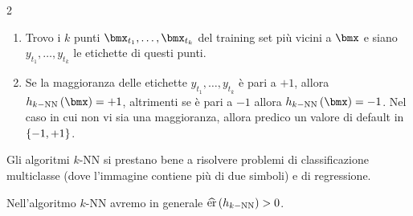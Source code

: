 \documentclass[\main/main.tex]{subfiles}
\begin{document}
\begin{multicols}{2}
\begin{definition}[Algoritmi \(k\)-NN]
        \begin{enumerate}
            \item Trovo i \(k\) punti \(\bmx_{t_1}, \ldots, \bmx_{t_k}\) del training set più vicini a \(\bmx\) e siano \(y_{t_1}, \ldots, y_{t_k}\) le etichette di questi punti.
            \item Se la maggioranza delle etichette \(y_{t_1}, \ldots, y_{t_k}\) è pari a \(+1\), allora \(\hkNN{\bmx} = +1\), altrimenti se è pari a \(-1\) allora \(\hkNN{\bmx} = -1\). Nel caso in cui non vi sia una maggioranza, allora predico un valore di default in \(\left\{-1, +1\right\}\).
        \end{enumerate}
    \end{definition}
    \begin{observation}
        Gli algoritmi \(k\)-NN si prestano bene a risolvere problemi di classificazione multiclasse (dove l'immagine contiene più di due simboli) e di regressione.
    \end{observation}
    \begin{observation}
        Nell'algoritmo \(k\)-NN avremo in generale \(\widehat{\text{er}}\left(h_{k-\text{NN}}\right)>0\).
    \end{observation}
\end{multicols}
\end{document}

